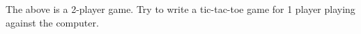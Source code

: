 \begin{ex}
The above is a 2-player game. Try to write a tic-tac-toe game for 1 player playing against the computer.
\end{ex}
